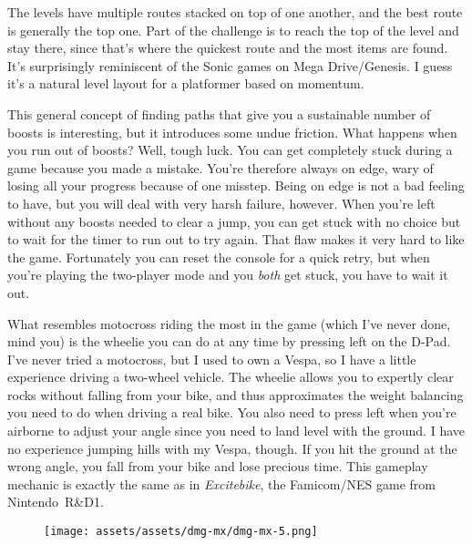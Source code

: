 \documentclass{book}
\let\oldcenter\center
\let\oldendcenter\endcenter
\renewenvironment{center}{\setlength\topsep{0pt}\oldcenter}{\oldendcenter}
\begin{document}
The levels have multiple routes stacked on top of one another, and the best route is generally the top one. Part of the challenge is to reach the top of the level and stay there, since that’s where the quickest route and the most items are found. It’s surprisingly reminiscent of the Sonic games on Mega Drive/Genesis. I guess it’s a natural level layout for a platformer based on momentum.

\begin{center}
\vspace{8pt}
\quad\vspace{4pt}
\end{center}

This general concept of finding paths that give you a sustainable number of boosts is interesting, but it introduces some undue friction. What happens when you run out of boosts? Well, tough luck. You can get completely stuck during a game because you made a mistake. You’re therefore always on edge, wary of losing all your progress because of one misstep. Being on edge is not a bad feeling to have, but you will deal with very harsh failure, however. When you’re left without any boosts needed to clear a jump, you can get stuck with no choice but to wait for the timer to run out to try again. That flaw makes it very hard to like the game. Fortunately you can reset the console for a quick retry, but when you’re playing the two-player mode and you \emph{both} get stuck, you have to wait it out.

What resembles motocross riding the most in the game (which I’ve never done, mind you) is the wheelie you can do at any time by pressing left on the D-Pad. I’ve never tried a motocross, but I used to own a Vespa, so I have a little experience driving a two-wheel vehicle. The wheelie allows you to expertly clear rocks without falling from your bike, and thus approximates the weight balancing you need to do when driving a real bike. You also need to press left when you’re airborne to adjust your angle since you need to land level with the ground. I have no experience jumping hills with my Vespa, though. If you hit the ground at the wrong angle, you fall from your bike and lose precious time. This gameplay mechanic is exactly the same as in \emph{Excitebike}, the Famicom/NES game from Nintendo R\&D1.

\begin{figure}[hbt]
\vskip 10pt
\centering \texttt{[image: assets/assets/dmg-mx/dmg-mx-5.png]}
\vskip 6pt
\end{figure}
\end{document}
